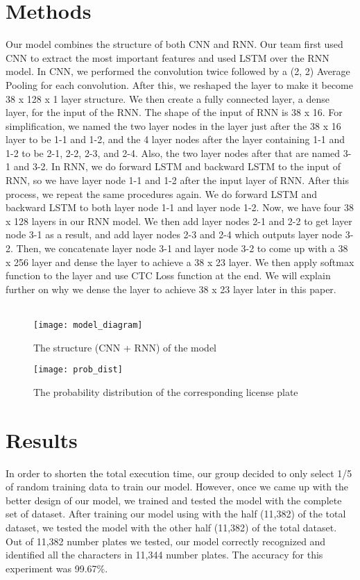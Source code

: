 \documentclass[conference]{IEEEtran}
\begin{document}
\section{Methods}
Our model combines the structure of both CNN and RNN. Our team first used CNN to extract the most important features and used LSTM over the RNN model. In CNN, we performed the convolution twice followed by a (2, 2) Average Pooling for each convolution. After this, we reshaped the layer to make it become 38 x 128 x 1 layer structure. We then create a fully connected layer, a dense layer, for the input of the RNN. The shape of the input of RNN is 38 x 16. For simplification, we named the two layer nodes in the layer just after the 38 x 16 layer to be 1-1 and 1-2, and the 4 layer nodes after the layer containing 1-1 and 1-2 to be 2-1, 2-2, 2-3, and 2-4. Also, the two layer nodes after that are named 3-1 and 3-2. In RNN, we do forward LSTM and backward LSTM to the input of RNN, so we have layer node 1-1 and 1-2 after the input layer of RNN. After this process, we repeat the same procedures again. We do forward LSTM and backward LSTM to both layer node 1-1 and layer node 1-2. Now, we have four 38 x 128 layers in our RNN model. We then add layer nodes 2-1 and 2-2 to get layer node 3-1 as a result, and add layer nodes 2-3 and 2-4 which outputs layer node 3-2. Then, we concatenate layer node 3-1 and layer node 3-2 to come up with a 38 x 256 layer and dense the layer to achieve a 38 x 23 layer. We then apply softmax function to the layer and use CTC Loss function at the end. We will explain further on why we dense the layer to achieve 38 x 23 layer later in this paper.
\\ \\
\begin{figure}[H]
\centering
\texttt{[image: model\_diagram]}
\caption{The structure (CNN + RNN) of the model}
\end{figure}

\begin{figure}[H]
\centering
\texttt{[image: prob\_dist]}
\caption{The probability distribution of the corresponding license plate}
\end{figure}

\section{Results}
In order to shorten the total execution time, our group decided to only select 1/5 of random training data to train our model. However, once we came up with the better design of our model, we trained and tested the model with the complete set of dataset.
After training our model using with the half (11,382) of the total dataset, we tested the model with the other half (11,382) of the total dataset. Out of 11,382 number plates we tested, our model correctly recognized and identified all the characters in 11,344 number plates. The accuracy for this experiment was 99.67\%.
\end{document}
